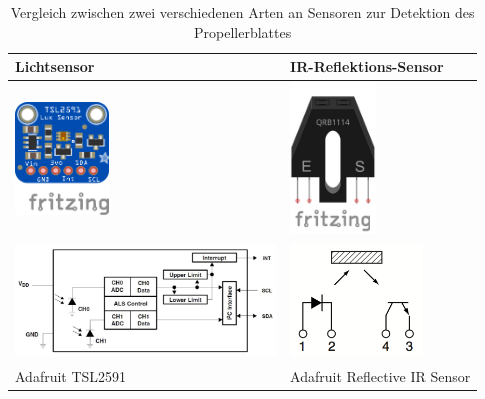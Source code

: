 \begin{table}[h]
	\centering
	\begin{tabularx}{0.95\textwidth}{M|M}

		Lichtsensor & IR-Reflektions-Sensor \\
		\hline
		\includegraphics[height=3cm]{images/chapter/03/sensor_tsl2591.jpg} & \includegraphics[height=4cm]{images/chapter/03/sensor_ir.jpg}  \\
		\includegraphics[height=3cm]{images/chapter/03/sensor_tsl2591_schema.png} & \includegraphics[height=3cm]{images/chapter/03/sensor_ir_schema.png} \\
		Adafruit TSL2591 & Adafruit Reflective IR Sensor \newline \\
	\end{tabularx}
	\caption{Vergleich zwischen zwei verschiedenen Arten an Sensoren zur Detektion des Propellerblattes}
\end{table}

